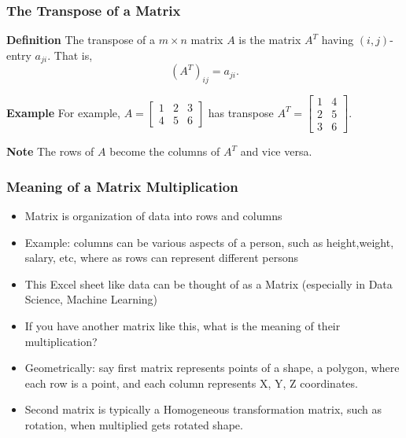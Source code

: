 \begin{frame}[fragile]\frametitle{The Transpose of a Matrix}
\textbf{Definition}
The transpose of a $m\times n$ matrix $A$ is the matrix $A^{T}$ 
having $(i,j)$-entry $a_{ji}$.  That is,
$$(A^{T})_{i j} = a_{j i}.$$



\textbf{Example}
For example, 
$ A = \left[ \begin{array}{rrr}
      1 & 2 & 3 \\
      4 & 5 & 6
     \end{array}\right]$
has transpose  
$A^T = \left[\begin{array}{rrr}
        1 & 4 \\ 
        2 & 5 \\
        3 & 6
       \end{array}\right]$.



\textbf{Note}
The rows of $A$ become the columns of $A^T$ and vice versa.

\end{frame}


\begin{frame}[fragile]\frametitle{Meaning of a Matrix Multiplication}

 \begin{itemize}
  \item Matrix is organization of data into rows and columns
  \item Example: columns can be various aspects of a person, such as height,weight, salary, etc, where as rows can represent different persons 
  \item This Excel sheet like data can be thought of as a Matrix (especially in Data Science, Machine Learning)
  \item If you have another matrix like this, what is the meaning of their multiplication?
  \item Geometrically: say first matrix represents points of a shape, a polygon, where each row is a point, and each column represents X, Y, Z coordinates.
  \item Second matrix is typically a Homogeneous transformation matrix, such as rotation,  when multiplied gets rotated shape.
 \end{itemize}

\end{frame}

